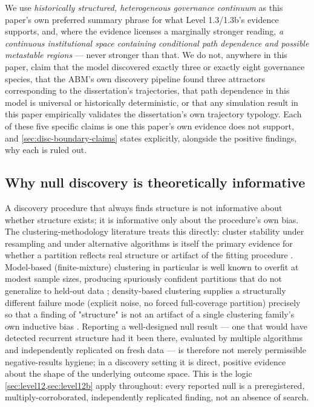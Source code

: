 We use \textit{historically structured, heterogeneous governance
continuum} as this paper's own preferred summary phrase for what Level
1.3/1.3b's evidence supports, and, where the evidence licenses a
marginally stronger reading, \textit{a continuous institutional space
containing conditional path dependence and possible metastable regions}
--- never stronger than that. We do not, anywhere in this paper, claim that
the model discovered exactly three or exactly eight governance species,
that the ABM's own discovery pipeline found three attractors corresponding
to the dissertation's trajectories, that path dependence in this model is
universal or historically deterministic, or that any simulation result in
this paper empirically validates the dissertation's own trajectory
typology. Each of these five specific claims is one this paper's own
evidence does not support, and \cref{sec:disc-boundary-claims} states
explicitly, alongside the positive findings, why each is ruled out.

\subsection{Why null discovery is theoretically informative}
\label{sec:why-null-informative}

A discovery procedure that always finds structure is not informative about
whether structure exists; it is informative only about the procedure's own
bias. The clustering-methodology literature treats this directly: cluster
stability under resampling and under alternative algorithms is itself the
primary evidence for whether a partition reflects real structure or
artifact of the fitting procedure
\parencite{benhur2002stability,vonluxburg2010clustering,hubert1985comparing,rousseeuw1987silhouettes}.
Model-based (finite-mixture) clustering in particular is well known to
overfit at modest sample sizes, producing spuriously confident partitions
that do not generalize to held-out data \parencite{fraley2002model};
density-based clustering supplies a structurally different failure mode
(explicit noise, no forced full-coverage partition) precisely so that a
finding of "structure" is not an artifact of a single clustering
family's own inductive bias \parencite{campello2013density}. Reporting a
well-designed null result --- one that would have detected recurrent
structure had it been there, evaluated by multiple algorithms and
independently replicated on fresh data --- is therefore not merely
permissible negative-results hygiene; in a discovery setting it is direct,
positive evidence about the shape of the underlying outcome space. This is
the logic \cref{sec:level12,sec:level12b} apply throughout: every reported
null is a preregistered, multiply-corroborated, independently replicated
finding, not an absence of search.
